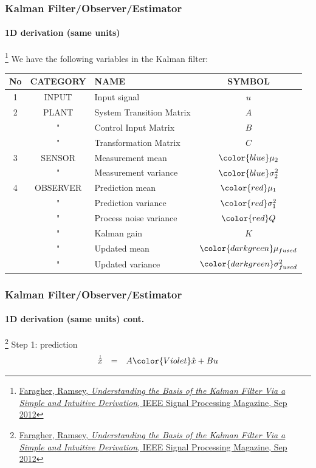 \documentclass{beamer}
\begin{document}
\begin{frame}
\frametitle{Kalman Filter/Observer/Estimator}
\framesubtitle{1D derivation (same units)}

\footnote{\tiny\hspace{-0.23in} \href{http://www.cl.cam.ac.uk/~rmf25/papers/Understanding the Basis of the Kalman Filter.pdf}{Faragher, Ramsey, \emph{Understanding the Basis of the Kalman Filter Via a Simple and Intuitive Derivation}, IEEE Signal Processing Magazine, Sep 2012}}
\scriptsize
We have the following variables in the Kalman filter:
\begin{table}\scriptsize
\begin{tabular}{|c |c |l |c |}\hline
\textbf{No}& \textbf{CATEGORY} & \textbf{NAME} & \textbf{SYMBOL}\\\hline
1&INPUT&Input signal & $u$\\\hline
2&PLANT & System Transition Matrix &$A$\\\hline
&" &  Control Input Matrix & $B$\\\hline
&" & Transformation Matrix & $C$\\\hline
3&{\color{blue}SENSOR} &{\color{blue}Measurement mean}&${\color{blue}\mu_2}$\\\hline
&{\color{blue}"} &{\color{blue}Measurement variance}&${\color{blue}\sigma^2_2}$\\\hline
4&OBSERVER &{\color{red}Prediction mean} & ${\color{red}\mu_1}$\\\hline
&" & {\color{red}Prediction variance} & ${\color{red}\sigma^2_1}$\\\hline
&"& {\color{red}Process noise variance}& ${\color{red}Q}$\\\hline
&"&Kalman gain&$K$\\\hline
&" &{\color{darkgreen}Updated mean}& ${\color{darkgreen}\mu_{fused}}$\\\hline
&"&{\color{darkgreen}Updated variance}& ${\color{darkgreen}\sigma^2_{fused}}$\\\hline
\end{tabular}
\end{table}
\end{frame}





\begin{frame}
\frametitle{Kalman Filter/Observer/Estimator}
\framesubtitle{1D derivation (same units) \tiny cont.}

\footnote{\tiny\hspace{-0.23in} \href{http://www.cl.cam.ac.uk/~rmf25/papers/Understanding the Basis of the Kalman Filter.pdf}{Faragher, Ramsey, \emph{Understanding the Basis of the Kalman Filter Via a Simple and Intuitive Derivation}, IEEE Signal Processing Magazine, Sep 2012}}
\scriptsize 
Step 1: {\color{red}prediction}\\
\begin{equation*}
\begin{array}{rlllll}
\dot{\hat{x}}&=& A {\color{Violet}\hat{x}}+ B u
\end{array}
\end{equation*}
\end{frame}
\end{document}
